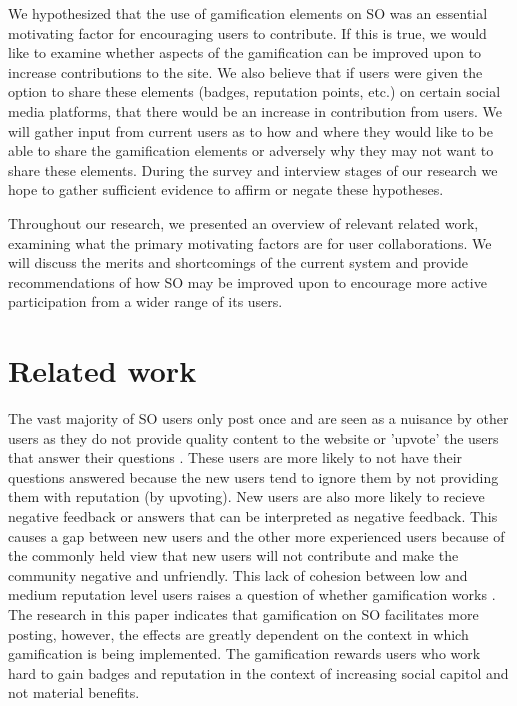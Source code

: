 \documentclass{sigchi}
\begin{document}
We hypothesized that the use of gamification elements on SO was an essential motivating factor for encouraging users to contribute. If this is true, we would like to examine whether aspects of the gamification can be improved upon to increase contributions to the site. We also believe that if users were given the option to share these elements (badges, reputation points, etc.) on certain social media platforms, that there would be an increase in contribution from users. We will gather input from current users as to how and where they would like to be able to share the gamification elements or adversely why they may not want to share these elements. During the survey and interview stages of our research we hope to gather sufficient evidence to affirm or negate these hypotheses.

Throughout our research, we presented an overview of relevant related work, examining what the primary motivating factors are for user collaborations. We will discuss the merits and shortcomings of the current system and provide recommendations of how SO may be improved upon to encourage more active participation from a wider range of its users.


\section{Related work}

The vast majority of SO users only post once and are seen as a nuisance by other users as they do not provide quality content to the website or 'upvote' the users that answer their questions \cite{Slag}. These users are more likely to not have their questions answered because the new users tend to ignore them by not providing them with reputation (by upvoting). New users are also more likely to recieve negative feedback or answers that can be interpreted as negative feedback. This causes a gap between new users and the other more experienced users because of the commonly held view that new users will not contribute and make the community negative and unfriendly. This lack of cohesion between low and medium reputation level users raises a question of whether gamification works \cite{Hamari}. The research in this paper indicates that gamification on SO facilitates more posting, however, the effects are greatly dependent on the context in which gamification is being implemented. The gamification rewards users who work hard to gain badges and reputation in the context of increasing social capitol and not material benefits.
\end{document}
